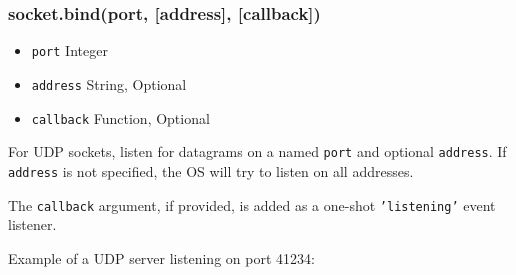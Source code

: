 \subsubsection{socket.bind(port, {[}address{]}, {[}callback{]})}

\begin{itemize}
\item
  \texttt{port} Integer
\item
  \texttt{address} String, Optional
\item
  \texttt{callback} Function, Optional
\end{itemize}

For UDP sockets, listen for datagrams on a named \texttt{port} and
optional \texttt{address}. If \texttt{address} is not specified, the OS
will try to listen on all addresses.

The \texttt{callback} argument, if provided, is added as a one-shot
\texttt{'listening'} event listener.

Example of a UDP server listening on port 41234:

\begin{Shaded}
\begin{Highlighting}[]
 \NormalTok{);}

 \NormalTok{(}\NormalTok{);}

\NormalTok{(}\NormalTok{, } 
  \NormalTok{(}  \NormalTok{+}
     \NormalTok{+ } \NormalTok{+ }\NormalTok{);}
\NormalTok{\});}

\NormalTok{(}\NormalTok{, } \NormalTok{() \{}
   \NormalTok{();}
  \NormalTok{(} \NormalTok{+}
       \NormalTok{+ } \NormalTok{+ }\NormalTok{);}
\NormalTok{\});}

\NormalTok{(}\NormalTok{);}
\end{Highlighting}
\end{Shaded}

